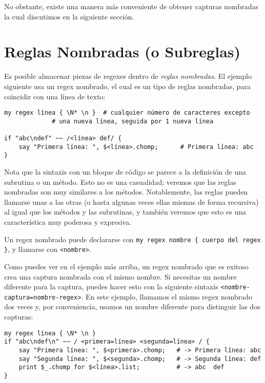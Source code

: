 No obstante, existe una manera más conveniente de obtener
capturas nombradas la cual discutimos en la siguiente sección.

\section{Reglas Nombradas (o Subreglas)}
\label{subrules}

Es posible almacenar piezas de regexes dentro 
de \emph{reglas nombradas}. El ejemplo siguiente usa un
regex nombrado, el cual es un tipo de reglas nombradas, 
para coincidir con una línea de texto:

\begin{lstlisting}
my regex línea { \N* \n }  # cualquier número de caracteres excepto
			 # una nueva línea, seguida por 1 nueva línea 

if "abc\ndef" ~~ /<línea> def/ {
    say "Primera línea: ", $<línea>.chomp;      # Primera línea: abc
}
\end{lstlisting} 

Nota que la sintaxis con un bloque de código se parece
a la definición de una subrutina o un método. Esto no es una
casualidad; veremos que las reglas nombradas son muy similares
a los métodos. Notablemente, las reglas pueden llamarse unas
a las otras (o hasta algunas veces ellas mismas de forma
recursiva) al igual que los métodos y las subrutinas,
y también veremos que esto es una característica muy poderosa
y expresiva.

Un regex nombrado puede declararse con 
\verb|my regex nombre { cuerpo del regex }|, y 
llamarse con {\tt <nombre>}.

Como puedes ver en el ejemplo más arriba, un regex
nombrado que es exitoso crea una captura nombrada 
con el mismo nombre. Si necesitas un nombre diferente
para la captura, puedes hacer esto con la siguiente
sintaxis {\tt <nombre-captura=nombre-regex>}. En este
ejemplo, llamamos el mismo regex nombrado dos veces y,
por conveniencia, usamos un nombre diferente para distinguir
las dos capturas:

\begin{lstlisting}
my regex línea { \N* \n }
if "abc\ndef\n" ~~ / <primera=línea> <segunda=línea> / {
    say "Primera línea: ", $<primera>.chomp;   # -> Primera línea: abc
    say "Segunda línea: ", $<segunda>.chomp;   # -> Segunda línea: def
    print $_.chomp for $<línea>.list;          # -> abc  def
}
\end{lstlisting}

